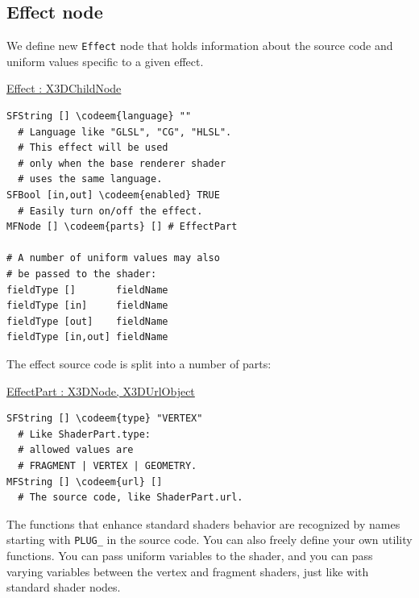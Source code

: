 \documentclass{egpubl}
\newenvironment{mycode}
{\begin{mycodecore}}
{\end{mycodecore}
\vspace{-0.1in}}
\newcommand*{\codeem}[1]{\textbf{#1}}
\begin{document}
\subsection{Effect node}

We define new \texttt{Effect} node that holds information about
the source code and uniform values specific to a given effect.

\begin{mycode}
\underline{Effect : X3DChildNode}
\begin{Verbatim}[commandchars=\\\{\}]
SFString [] \codeem{language} ""
  # Language like "GLSL", "CG", "HLSL".
  # This effect will be used
  # only when the base renderer shader
  # uses the same language.
SFBool [in,out] \codeem{enabled} TRUE
  # Easily turn on/off the effect.
MFNode [] \codeem{parts} [] # EffectPart

# A number of uniform values may also
# be passed to the shader:
fieldType []       fieldName
fieldType [in]     fieldName
fieldType [out]    fieldName
fieldType [in,out] fieldName
\end{Verbatim}
\end{mycode}



\needspace{1in}
The effect source code is split into a number of parts:

\begin{mycode}
\underline{EffectPart : X3DNode, X3DUrlObject}
\begin{Verbatim}[commandchars=\\\{\}]
SFString [] \codeem{type} "VERTEX"
  # Like ShaderPart.type:
  # allowed values are
  # FRAGMENT | VERTEX | GEOMETRY.
MFString [] \codeem{url} []
  # The source code, like ShaderPart.url.
\end{Verbatim}
\end{mycode}


The functions that enhance standard shaders behavior are recognized
by names starting with \texttt{PLUG\_} in the source code.
You can also freely define your own utility functions.
You can pass uniform variables to the shader,
and you can pass varying variables between the vertex and fragment
shaders, just like with standard shader nodes.
\end{document}
